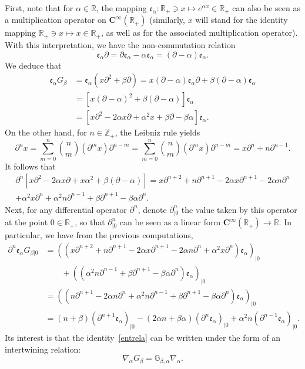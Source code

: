 \documentclass[10pt]{amsart}
\theoremstyle{definition}\newtheorem{defi}[theo]{Definition}\newtheorem{rema}[theo]{Remark}\newtheorem{exam}[theo]{Example}\newtheorem{exem}[theo]{Example}\newtheorem{nota}[theo]{Notation}
\newcommand{\cC}{{\mathbf C}}
\newcommand{\RR}{\mathbb{R}}
\newcommand{\ZZ}{\mathbb{Z}}
\newcommand{\fe}{\mathfrak{e}}
\newcommand{\iy}{\infty}
\newcommand{\lt}{\left}
\newcommand{\na}{\nabla}
\newcommand{\pa}{\partial}
\newcommand{\ri}{\rightarrow}
\newcommand{\rt}{\right}
\newcommand{\dBg}{{\discret{G}}}
\newcommand{\Bg}{G}
\newcommand{\discret}[1]{\mathds{#1}}
\begin{document}
First, note that for $\alpha\in\RR$, the mapping $ \fe_{\alpha} : \RR_+\ni x\mapsto e^{\alpha x}\in\RR_+ $ can also be seen as a multiplication operator on $\cC^\iy(\RR_+)$ (similarly, $x$ will stand for the identity mapping $\RR_+\ni x\mapsto x\in\RR_+$, as well as for the associated multiplication operator). With this interpretation, we have the non-commutation relation
\[
\fe_{\alpha}\pa=\pa \fe_{\alpha} -\alpha\fe_{\alpha} =(\pa-\alpha)\fe_{\alpha}.
\]
We deduce that
\begin{align*}
\fe_{\alpha}\Bg_{\beta}&=\fe_{\alpha}(x\pa^2+\beta\pa) =x (\pa-\alpha)\fe_{\alpha}\pa +\beta(\pa-\alpha)\fe_{\alpha}\\
&=[x(\pa-\alpha)^2+\beta(\pa-\alpha)]\fe_{\alpha}\\
&=[x\pa^2-2\alpha x\pa+\alpha^2x+\beta\pa-\beta\alpha]\fe_{\alpha}.
\end{align*}
On the other hand, for $n\in\ZZ_+$, the Leibniz rule yields
\[
\pa^n x=\sum_{m=0}^n\binom{n}{m} (\pa^mx)\pa^{n-m} =\sum_{m=0}^n\binom{n}{m} (\pa^mx)\pa^{n-m} =x\pa^n+n\pa^{n-1}.
\]
It follows that
\begin{multline*}
\pa^n[x\pa^2-2\alpha x\pa+x\alpha^2+\beta (\pa-\alpha)]=x\pa^{n+2}+n\pa^{n+1}-2\alpha x\pa^{n+1}-2\alpha n\pa^{n}\\
+\alpha^2x\pa^n+\alpha^2n\pa^{n-1}+\beta\pa^{n+1}-\beta\alpha\pa^n.
\end{multline*}
Next, for any differential operator $\pa^n$, denote $\pa^n_{\vert 0}$ the value taken by this operator at the point $0\in\RR_+$, so that $\pa^n_{\vert 0}$ can be seen as a linear form $\cC^\iy(\RR_+)\ri\RR$. In particular, we have from the previous computations,
\begin{align}
\nonumber\pa^n\fe_{\alpha}\Bg_{\beta\vert 0}&=\lt((x\pa^{n+2}+n\pa^{n+1}-2\alpha x\pa^{n+1}-2\alpha n\pa^{n} +\alpha^2x\pa^n)\fe_{\alpha}\rt)_{\vert 0}\\
&\qquad +\lt((\alpha^2n\pa^{n-1}+\beta\pa^{n+1}-\beta\alpha\pa^n)\fe_{\alpha}\rt)_{\vert 0}\nonumber \\
\nonumber
&=\lt((n\pa^{n+1}-2\alpha n\pa^{n} +\alpha^2n\pa^{n-1}+\beta\pa^{n+1}-\beta\alpha\pa^n)\fe_{\alpha}\rt)_{\vert 0}\\
&=(n+\beta)(\pa^{n+1}\fe_{\alpha})_{\vert 0}-(2\alpha n+\beta\alpha)(\pa^{n}\fe_{\alpha})_{\vert 0}+\alpha^2n(\pa^{n-1}\fe_{\alpha})_{\vert 0}.\label{entrela}
\end{align}
Its interest is that the identity~\eqref{entrela} can be written under the form of an intertwining relation:
\begin{equation}\label{ab}
\na_{\alpha} \Bg_{\beta}=\dBg_{\beta,\alpha}\na_{\alpha}.
\end{equation}
\end{document}
